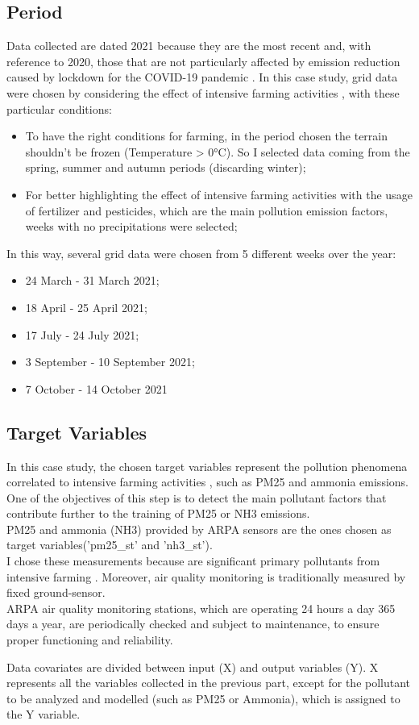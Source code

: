 \subsection{Period}  
Data collected are dated 2021 because they are the most recent and, with reference to 2020, those that are not particularly affected by emission reduction caused by lockdown for the COVID-19 pandemic \cite{bontempi2022analysis}. 
\pagebreak
In this case study, grid data were chosen by considering the effect of intensive farming activities , with these particular conditions:
    \begin{itemize}
        \item To have the right conditions for farming, in the period chosen the terrain shouldn't be frozen (Temperature > 0°C). So I selected data coming from the spring, summer and autumn periods (discarding winter);
        \item For better highlighting the effect of intensive farming activities with the usage of fertilizer and pesticides, which are the main pollution emission factors, weeks with no precipitations were selected;
\end{itemize}
In this way, several grid data were chosen from 5 different weeks over the year:
\begin{itemize}
    \item 24 March - 31 March 2021;
    \item 18 April - 25 April 2021;
    \item 17 July - 24 July 2021;
    \item 3 September - 10 September 2021;
    \item 7 October - 14 October 2021
\end{itemize}

\subsection{Target Variables}
In this case study, the chosen target variables represent the pollution phenomena correlated to intensive farming activities , such as PM25 and ammonia emissions. \\
One of the objectives of this step is to detect the main pollutant factors that contribute further to the training of PM25 or NH3 emissions.\\
PM25 and ammonia (NH3) provided by ARPA sensors are the ones chosen as target variables('pm25\_st' and 'nh3\_st').\\
I chose these measurements because are significant primary pollutants from intensive farming \cite{aneja2008farming}. Moreover, air quality monitoring is traditionally measured by fixed ground-sensor.
\\
ARPA air quality monitoring stations, which are operating 24 hours a day 365 days a year, are periodically checked and subject to maintenance, to ensure proper functioning and reliability.\par
Data covariates are divided between input (X) and output variables (Y). X represents all the variables collected in the previous part, except for the pollutant to be analyzed and modelled (such as PM25 or Ammonia), which is assigned to the Y variable.
